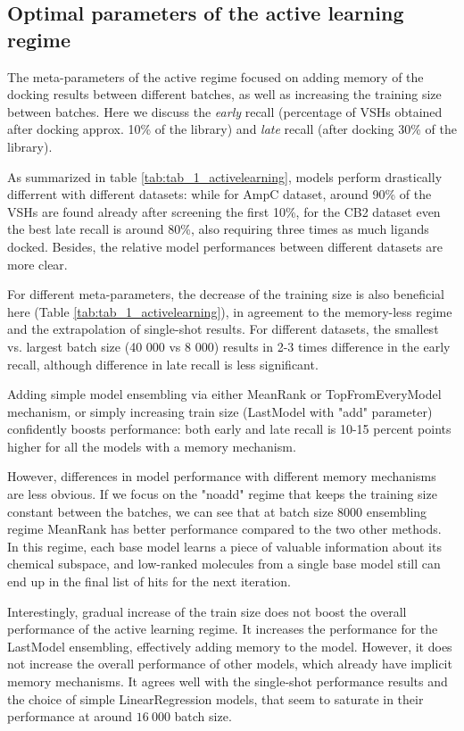 \subsection{Optimal parameters of the active learning regime}
The meta-parameters of the active regime focused on adding memory of the docking results between different batches, as well as increasing the training size between batches. Here we discuss the \textit{early} recall (percentage of VSHs obtained after docking approx. 10\% of the library) and \textit{late} recall (after docking 30\% of the library).

As summarized in table \ref{tab:tab_1_activelearning}, models perform drastically differrent with different datasets: while for AmpC dataset, around 90\% of the VSHs are found already after screening the first 10\%, for the CB2 dataset even the best late recall is around 80\%, also requiring three times as much ligands docked. Besides, the relative model performances between different datasets are more clear.

For different meta-parameters, the decrease of the training size is also beneficial here (Table \ref{tab:tab_1_activelearning}), in agreement to the memory-less regime and the extrapolation of single-shot results. For different datasets, the smallest vs. largest batch size (40 000 vs 8 000) results in 2-3 times difference in the early recall, although difference in late recall is less significant.

Adding simple model ensembling via either MeanRank or TopFromEveryModel mechanism, or simply increasing train size (LastModel with "add" parameter) confidently boosts performance: both early and late recall is 10-15 percent points higher for all the models with a memory mechanism.

However, differences in model performance with different memory mechanisms are less obvious. If we focus on the "noadd" regime that keeps the training size constant between the batches, we can see that at batch size 8000  ensembling regime MeanRank has better performance compared to the two other methods. In this regime, each base model learns a piece of valuable information about its chemical subspace, and low-ranked molecules from a single base model still can end up in the final list of hits for the next iteration.

Interestingly, gradual increase of the train size does not boost the overall performance of the active learning regime. It increases the performance for the LastModel ensembling, effectively adding memory to the model. However, it does not increase the overall performance of other models, which already have implicit memory mechanisms. It agrees well with the single-shot performance results and the choice of simple LinearRegression models, that seem to saturate in their performance at around $16\ 000$ batch size.

